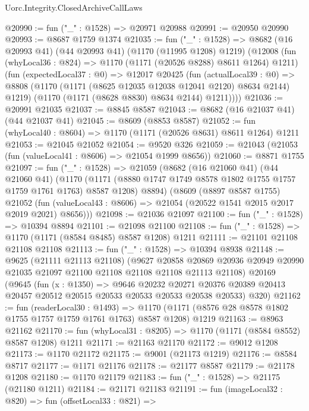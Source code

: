 \begin{lexlean}{Uorc.Integrity.ClosedArchiveCallLaws}
\begin{coremodule}
@20990 := fun ("_" : @1528) => @20971 @20988
@20991 := @20950 @20990
@20993 := @8687 @1759 @1374
@21035 := fun ("_" : @1528) =>
  @8682
    (@16 @20993 @41)
    (@44 @20993 @41)
    (@1170 (@11995 @1208) @1219)
    (@12008
      (fun (whyLocal36 : @824) => @1170 (@1171 (@20526 @8288) @8611 @1264) @1211)
      (fun (expectedLocal37 : @0) =>
      @12017
        @20425
        (fun (actualLocal39 : @0) =>
        @8808
          (@1170 (@1171 (@8625 @12035 @12038 @12041 @2120) @8634 @2144) @1219)
          (@1170 (@1171 (@8628 @8830) @8634 @2144) @1211))))
@21036 := @20991 @21035
@21037 := @8845 @8587
@21043 := @8682 (@16 @21037 @41) (@44 @21037 @41)
@21045 := @8609 (@8853 @8587)
@21052 := fun (whyLocal40 : @8604) => @1170 (@1171 (@20526 @8631) @8611 @1264) @1211
@21053 := @21045 @21052
@21054 := @9520 @326
@21059 := @21043 (@21053 (fun (valueLocal41 : @8606) => @21054 @1999 @8656))
@21060 := @8871 @1755
@21097 := fun ("_" : @1528) =>
  @21059
    (@8682
      (@16 @21060 @41)
      (@44 @21060 @41)
      (@1170
        (@1171 (@8880 @1747 @1749 @8578 @1802 @1755 @1757 @1759 @1761 @1763) @8587 @1208)
        @8894)
      (@8609
        (@8897 @8587 @1755)
        @21052
        (fun (valueLocal43 : @8606) => @21054 (@20522 @1541 @2015 @2017 @2019 @2021) @8656)))
@21098 := @21036 @21097
@21100 := fun ("_" : @1528) => @10394 @8894
@21101 := @21098 @21100
@21108 := fun ("_" : @1528) => @1170 (@1171 (@8584 @8485) @8587 @1208) @1211
@21111 := @21101 @21108 @21108 @21108
@21113 := fun ("_" : @1528) => @10394 @8938
@21148 := @9625
    (@21111 @21113 @21108)
    (@9627
      @20858
      @20869
      @20936
      @20949
      @20990
      @21035
      @21097
      @21100
      @21108
      @21108
      @21108
      @21113
      @21108)
    @20169
    (@9645
      (fun (x : @1350) =>
      @9646
        @20232
        @20271
        @20376
        @20389
        @20413
        @20457
        @20512
        @20515
        @20533
        @20533
        @20533
        @20538
        @20533)
      @320)
@21162 := fun (readerLocal30 : @1493) =>
  @1170 (@1171 (@8576 @28 @8578 @1802 @1755 @1757 @1759 @1761 @1763) @8587 @1208) @1219
@21163 := @8963 @21162
@21170 := fun (whyLocal31 : @8205) => @1170 (@1171 (@8584 @8552) @8587 @1208) @1211
@21171 := @21163 @21170
@21172 := @9012 @1208
@21173 := @1170 @21172
@21175 := @9001 (@21173 @1219)
@21176 := @8584 @8717
@21177 := @1171 @21176
@21178 := @21177 @8587
@21179 := @21178 @1208
@21180 := @1170 @21179
@21183 := fun ("_" : @1528) => @21175 (@21180 @1211)
@21184 := @21171 @21183
@21191 := fun (imageLocal32 : @820) =>
  fun (offsetLocal33 : @821) =>

\end{coremodule}
\end{lexlean}
